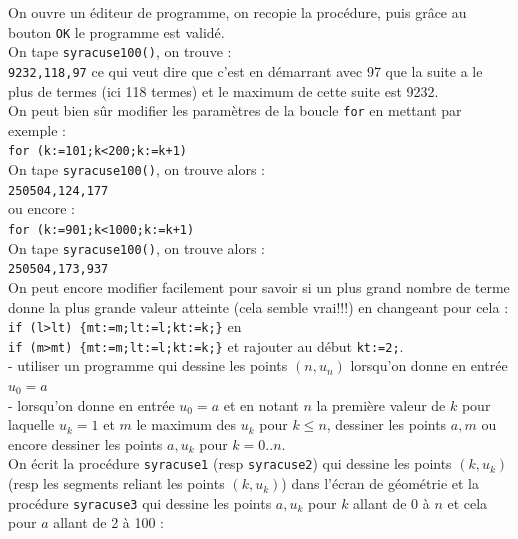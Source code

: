 \documentclass[a4paper,11pt]{book}
\begin{document}
On ouvre un \'editeur de programme, on recopie la proc\'edure, puis gr\^ace au 
bouton {\tt OK} le programme est valid\'e.\\
On tape {\tt syracuse100()}, on trouve :\\
{\tt 9232,118,97} ce qui veut dire que c'est en d\'emarrant avec 97 que la 
suite a le plus de termes (ici 118 termes) et le maximum de cette suite est 
9232. \\
On peut bien s\^ur modifier les param\`etres de la boucle {\tt for} en mettant 
par exemple :\\
{\tt for (k:=101;k<200;k:=k+1)}\\
On tape {\tt syracuse100()}, on trouve alors :\\
{\tt 250504,124,177}\\
ou encore :\\
{\tt for (k:=901;k<1000;k:=k+1)}\\
On tape {\tt syracuse100()}, on trouve alors :\\
{\tt 250504,173,937}\\
On peut encore modifier facilement pour savoir si un plus grand nombre de 
terme donne la plus grande valeur atteinte (cela semble vrai!!!) en changeant 
pour cela :\\
{\tt if (l>lt) \{mt:=m;lt:=l;kt:=k;\}} en \\
{\tt if (m>mt) \{mt:=m;lt:=l;kt:=k;\}} et rajouter au d\'ebut  {\tt kt:=2;}.\\
- utiliser un programme qui dessine les points $(n,u_n)$ lorsqu'on donne en 
entr\'ee $u_0=a$\\
- lorsqu'on donne en entr\'ee $u_0=a$ et en notant $n$ la premi\`ere valeur de 
$k$ pour laquelle $u_k=1$ et $m$ le maximum des $u_k$ pour $k\leq n$, dessiner 
les points $a,m$ ou encore dessiner les points  $a,u_k$ pour $k=0..n$.\\
On \'ecrit la proc\'edure {\tt syracuse1} (resp {\tt syracuse2}) qui dessine 
 les points $(k,u_k)$ (resp les segments reliant les points $(k,u_k)$) dans 
l'\'ecran de g\'eom\'etrie et la proc\'edure {\tt syracuse3} qui
 dessine les points $a,u_k$ pour $k$ allant de 0  \`a $n$ et cela pour $a$ 
allant de 2 \`a 100 :
\end{document}
